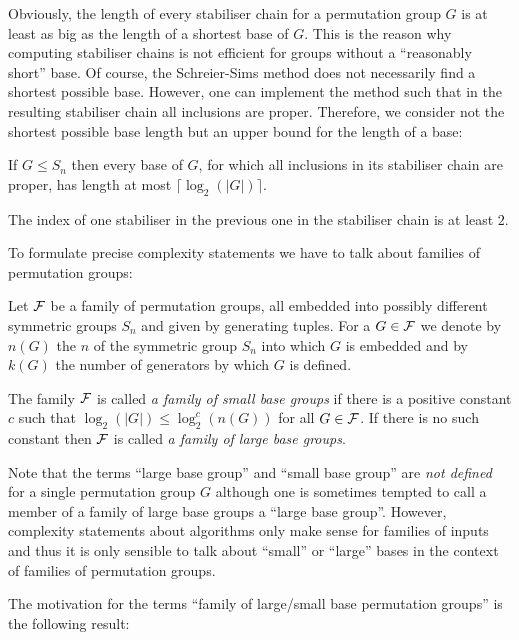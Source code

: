Obviously, the length of every stabiliser chain for a permutation group 
$G$ is at least as big as the length of a shortest base of $G$.
This is the reason why computing stabiliser chains is not efficient
for groups without a ``reasonably short'' base. Of course, the
Schreier-Sims method does not necessarily find a shortest possible base.
However, one can implement the method such that in the resulting
stabiliser chain all inclusions are proper.
Therefore, we consider not the shortest possible base length but
an upper bound for the length of a base:

\begin{Prop}
If $G \le S_n$ then every base of $G$, for which all inclusions in its
stabiliser chain are proper, has length at most $\lceil \log_2(|G|) \rceil$.
\end{Prop}
\proofbeg
The index of one stabiliser in the previous one in the stabiliser chain is
at least $2$.
\proofend

To formulate precise complexity statements we have to talk about families
of permutation groups:

\begin{Def}
Let $\mathcal{F}$ be a family of permutation groups, all embedded into
possibly different symmetric groups $S_n$ and given by generating tuples. 
For a $G \in \mathcal{F}$ we denote 
by $n(G)$ the $n$ of the symmetric group $S_n$ into which $G$ is embedded
and by $k(G)$ the number of generators by which $G$ is defined.

The family $\mathcal{F}$ is called \emph{a family of small base groups} if there
is a positive constant $c$ such that $\log_2(|G|) \le \log^c_2(n(G))$ for all
$G \in \mathcal{F}$. If there is no such constant then $\mathcal{F}$ is called
\emph{a family of large base groups}.
\end{Def}

\begin{Rem}
Note that the terms ``large base group'' and ``small base group'' are
\emph{not defined} for a single permutation group $G$ although one is
sometimes tempted to call a member of a family of large base groups
a ``large base group''. However, complexity statements about algorithms
only make sense for families of inputs and thus it is only sensible to
talk about ``small'' or ``large'' bases in the context of families of
permutation groups.
\end{Rem}

The motivation for the terms ``family of large/small base permutation
groups'' is the following result:

